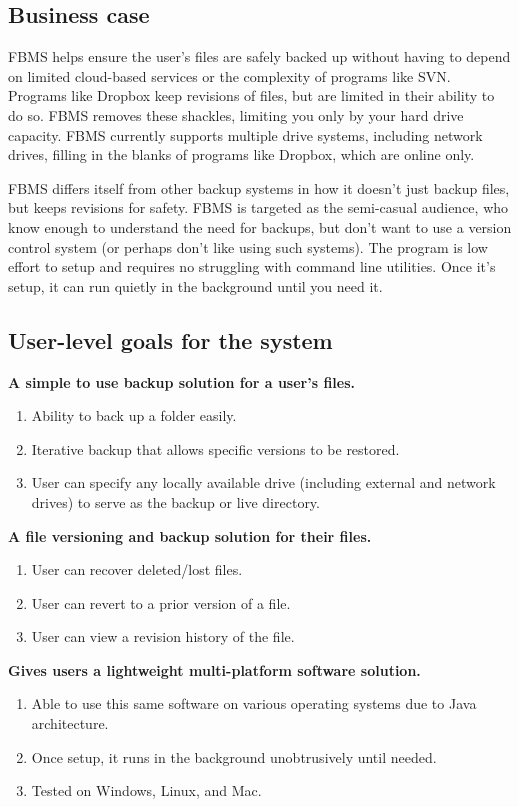 \documentclass[12pt,a4paper]{article}
\begin{document}
\subsection{Business case}
FBMS helps ensure the user's files are safely backed up without having to depend on limited cloud-based services or the complexity of programs like SVN\cite{svn}. Programs like Dropbox\cite{dropbox} keep revisions of files, but are limited in their ability to do so. FBMS removes these shackles, limiting you only by your hard drive capacity. FBMS currently supports multiple drive systems, including network drives, filling in the blanks of programs like Dropbox, which are online only.

FBMS differs itself from other backup systems in how it doesn't just backup files, but keeps revisions for safety. FBMS is targeted as the semi-casual audience, who know enough to understand the need for backups, but don't want to use a version control system (or perhaps don't like using such systems). The program is low effort to setup and requires no struggling with command line utilities. Once it's setup, it can run quietly in the background until you need it.

\subsection{User-level goals for the system}
\textbf{A simple to use backup solution for a user's files.}
\begin{enumerate}
\item Ability to back up a folder easily.
\item Iterative backup that allows specific versions to be restored.
\item User can specify any locally available drive (including external and network drives) to serve as the backup or live directory.
\end{enumerate}

\textbf{A file versioning and backup solution for their files.}
\begin{enumerate}
\item User can recover deleted/lost files.
\item User can revert to a prior version of a file.
\item User can view a revision history of the file.
\end{enumerate}

\textbf{Gives users a lightweight multi-platform software solution.}
\begin{enumerate}
\item Able to use this same software on various operating systems due to Java architecture.
\item Once setup, it runs in the background unobtrusively until needed.
\item Tested on Windows, Linux, and Mac.
\end{enumerate}
\end{document}
